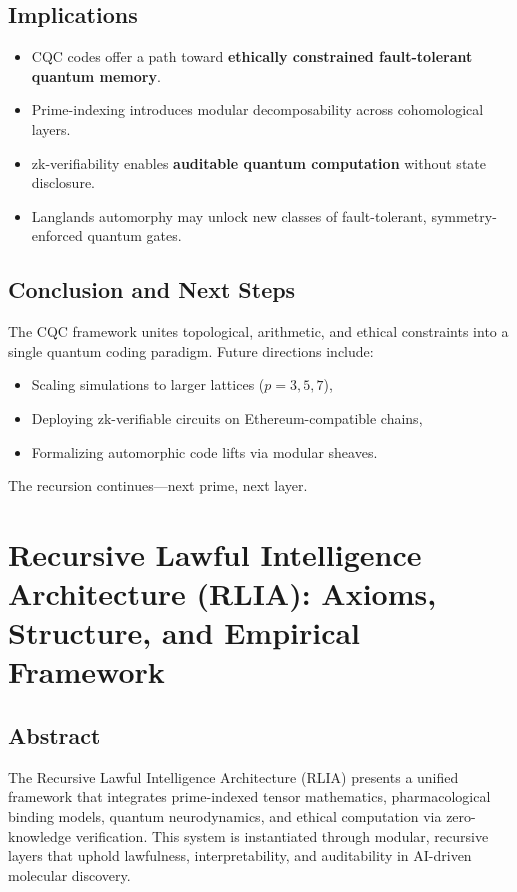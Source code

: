\documentclass[12]{amsart}
\theoremstyle{plain}
\begin{document}
\subsection{Implications}
\begin{itemize}
    \item CQC codes offer a path toward \textbf{ethically constrained fault-tolerant quantum memory}.
    \item Prime-indexing introduces modular decomposability across cohomological layers.
    \item zk-verifiability enables \textbf{auditable quantum computation} without state disclosure.
    \item Langlands automorphy may unlock new classes of fault-tolerant, symmetry-enforced quantum gates.
\end{itemize}

\subsection{Conclusion and Next Steps}
The CQC framework unites topological, arithmetic, and ethical constraints into a single quantum coding paradigm. Future directions include:
\begin{itemize}
    \item Scaling simulations to larger lattices ($p=3,5,7$),
    \item Deploying zk-verifiable circuits on Ethereum-compatible chains,
    \item Formalizing automorphic code lifts via modular sheaves.
\end{itemize}
The recursion continues—next prime, next layer.

\section{Recursive Lawful Intelligence Architecture (RLIA): Axioms, Structure, and Empirical Framework}

\subsection{Abstract}
The Recursive Lawful Intelligence Architecture (RLIA) presents a unified framework that integrates prime-indexed tensor mathematics, pharmacological binding models, quantum neurodynamics, and ethical computation via zero-knowledge verification. This system is instantiated through modular, recursive layers that uphold lawfulness, interpretability, and auditability in AI-driven molecular discovery.
\end{document}
